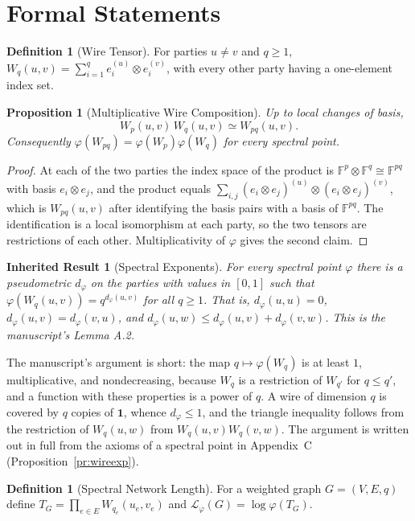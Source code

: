 \documentclass[11pt,letterpaper]{report}
\theoremstyle{plain}
\newtheorem{proposition}[theorem]{Proposition}
\newtheorem{inherited}[theorem]{Inherited Result}
\theoremstyle{definition}
\newtheorem{definition}[theorem]{Definition}
\theoremstyle{remark}
\begin{document}
\section{Formal Statements}

\begin{definition}[Wire Tensor]
For parties $u\ne v$ and $q\ge1$, $W_q(u,v)=\sum_{i=1}^{q}e_i^{(u)}\otimes e_i^{(v)}$, with every other party having a one-element index set.
\end{definition}

\begin{proposition}[Multiplicative Wire Composition]
Up to local changes of basis,
\[
W_p(u,v)\,W_q(u,v)\simeq W_{pq}(u,v).
\]
Consequently $\varphi(W_{pq})=\varphi(W_p)\varphi(W_q)$ for every spectral point.
\end{proposition}
\begin{proof}
At each of the two parties the index space of the product is $\mathbb F^p\otimes\mathbb F^q\cong\mathbb F^{pq}$ with basis $e_i\otimes e_j$, and the product equals $\sum_{i,j}(e_i\otimes e_j)^{(u)}\otimes(e_i\otimes e_j)^{(v)}$, which is $W_{pq}(u,v)$ after identifying the basis pairs with a basis of $\mathbb F^{pq}$. The identification is a local isomorphism at each party, so the two tensors are restrictions of each other. Multiplicativity of $\varphi$ gives the second claim.
\end{proof}

\begin{inherited}[Spectral Exponents]\label{inh:exponents}
For every spectral point $\varphi$ there is a pseudometric $d_\varphi$ on the parties with values in $[0,1]$ such that $\varphi(W_q(u,v))=q^{d_\varphi(u,v)}$ for all $q\ge1$. That is, $d_\varphi(u,u)=0$, $d_\varphi(u,v)=d_\varphi(v,u)$, and $d_\varphi(u,w)\le d_\varphi(u,v)+d_\varphi(v,w)$. This is the manuscript's Lemma A.2.
\end{inherited}

The manuscript's argument is short: the map $q\mapsto\varphi(W_q)$ is at least $1$, multiplicative, and nondecreasing, because $W_q$ is a restriction of $W_{q'}$ for $q\le q'$, and a function with these properties is a power of $q$. A wire of dimension $q$ is covered by $q$ copies of $\mathbf 1$, whence $d_\varphi\le1$, and the triangle inequality follows from the restriction of $W_q(u,w)$ from $W_q(u,v)W_q(v,w)$. The argument is written out in full from the axioms of a spectral point in Appendix~C (Proposition~\ref{pr:wireexp}).

\begin{definition}[Spectral Network Length]
For a weighted graph $G=(V,E,q)$ define $T_G=\prod_{e\in E}W_{q_e}(u_e,v_e)$ and $\mathcal L_\varphi(G)=\log\varphi(T_G)$.
\end{definition}
\end{document}
